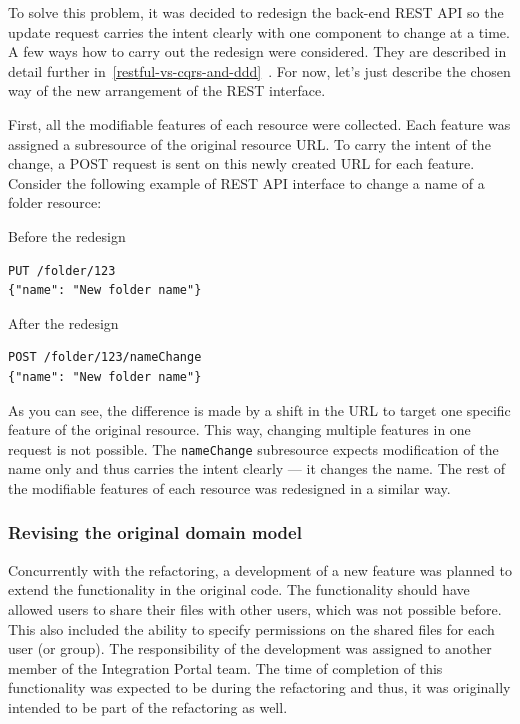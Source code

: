 \documentclass{book}
\begin{document}
To solve this problem, it was decided to redesign the back-end REST API
so the update request carries the intent clearly with one component to
change at a time. A few ways how to carry out the redesign were
considered. They are described in detail further in~\ref{restful-vs-cqrs-and-ddd}~. For now, let's just describe the
chosen way of the new arrangement of the REST interface.

First, all the modifiable features of each resource were collected. Each
feature was assigned a subresource of the original resource URL. To
carry the intent of the change, a POST request is sent on this newly
created URL for each feature. Consider the following example of REST API
interface to change a name of a folder resource:

\noindent Before the redesign

\begin{lstlisting}[caption={}]
PUT /folder/123
{"name": "New folder name"}
\end{lstlisting}

\noindent After the redesign

\begin{lstlisting}[caption={}]
POST /folder/123/nameChange
{"name": "New folder name"}
\end{lstlisting}

As you can see, the difference is made by a shift in the URL to target
one specific feature of the original resource. This way, changing
multiple features in one request is not possible. The
\texttt{nameChange} subresource expects modification of the name only
and thus carries the intent clearly --- it changes the name. The rest of
the modifiable features of each resource was redesigned in a similar
way.

\subsubsection{Revising the original domain
model}\label{revising-the-original-domain-model}

Concurrently with the refactoring, a development of a new feature was
planned to extend the functionality in the original code. The
functionality should have allowed users to share their files with other
users, which was not possible before. This also included the ability to
specify permissions on the shared files for each user (or group). The
responsibility of the development was assigned to another member of the
Integration Portal team. The time of completion of this functionality
was expected to be during the refactoring and thus, it was originally
intended to be part of the refactoring as well.
\end{document}
